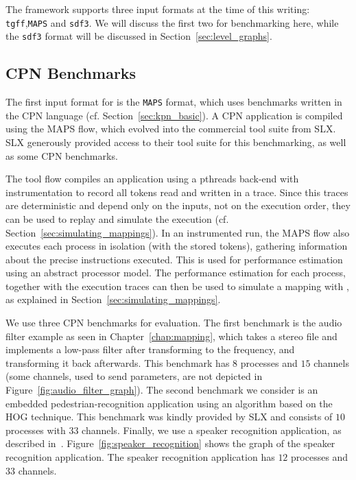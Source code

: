 The \mocasin framework supports three input formats at the time of this writing: \texttt{tgff},\texttt{MAPS} and \texttt{sdf3}.
We will discuss the first two for benchmarking here, while the \texttt{sdf3} format will be discussed in Section~\ref{sec:level_graphs}.

\subsection{CPN Benchmarks}

The first input format for \mocasin is the \texttt{MAPS} format, which uses benchmarks written in the \ac{CPN} language (cf. Section~\ref{sec:kpn_basic}).
A \ac{CPN} application is compiled using the \ac{MAPS} flow, which evolved into the commercial tool suite from SLX.
SLX generously provided access to their tool suite for this benchmarking, as well as some \ac{CPN} benchmarks. 

The tool flow compiles an application using a \acp{pthread} back-end with instrumentation to record all tokens read and written in a trace.
Since this traces are deterministic and depend only on the inputs, not on the execution order, they can be used to replay and simulate the execution (cf. Section~\ref{sec:simulating_mappings}).
In an instrumented run, the \ac{MAPS} flow also executes each process in isolation (with the stored tokens), gathering information about the precise instructions executed.
This is used for performance estimation using an abstract processor model\cite{eusse2014pre}.
The performance estimation for each process, together with the execution traces can then be used to simulate a mapping with \mocasin, as explained in Section~\ref{sec:simulating_mappings}.

We use three \ac{CPN} benchmarks for evaluation.
The first benchmark is the audio filter example as seen in Chapter~\ref{chap:mapping}, which takes a stereo file and implements a low-pass filter after transforming to the frequency, and transforming it back afterwards.
This benchmark has $8$ processes and $15$ channels (some channels, used to send parameters, are not depicted in Figure~\ref{fig:audio_filter_graph}).
The second benchmark we consider is an embedded pedestrian-recognition application using an algorithm based on the \ac{HOG} technique.
This benchmark was kindly provided by SLX and consists of $10$ processes with $33$ channels.
Finally, we use a speaker recognition application, as described in~\cite{bouraoui2019comparing}.
Figure~\ref{fig:speaker_recognition} shows the graph of the speaker recognition application. 
The speaker recognition application has $12$ processes and $33$ channels.

